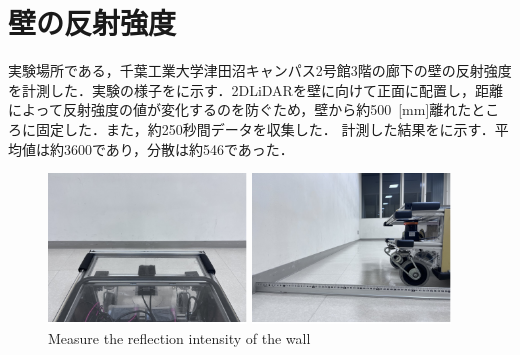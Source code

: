 \section{壁の反射強度}

  実験場所である，千葉工業大学津田沼キャンパス2号館3階の廊下の壁の反射強度を計測した．実験の様子をに示す．2DLiDARを壁に向けて正面に配置し，距離によって反射強度の値が変化するのを防ぐため，壁から約500 \,[mm]離れたところに固定した．また，約250秒間データを収集した．
  計測した結果をに示す．平均値は約3600であり，分散は約546であった．

  \begin{figure}[h]
    \centering
    \begin{minipage}[c]{65mm} 
        \centering
        \includegraphics[height=40mm]{images/pdf/RobotGuidance_exp1_wall_from_back}
    \end{minipage}
    \begin{minipage}[c]{65mm} 
        \centering
        \includegraphics[height=40mm]{images/pdf/RobotGuidance_exp1_wall_from_side}
    \end{minipage}
    \caption{Measure the reflection intensity of the wall}
    \label{Fig:RobotGuidance_exp1_wall}
  \end{figure}

